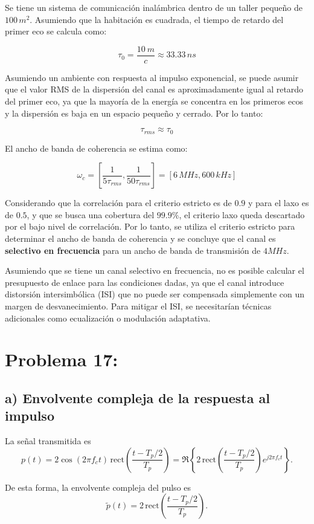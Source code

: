 \documentclass[11pt]{article}
\begin{document}
Se tiene un sistema de comunicación inalámbrica dentro de un taller pequeño de $100 \, m^2$. Asumiendo que la habitación es cuadrada, el tiempo de retardo del primer eco se calcula como:

\[
\tau_0 = \frac{\SI{10}{m}}{c} \approx 33.33 \, ns
\]

Asumiendo un ambiente con respuesta al impulso exponencial, se puede asumir que el valor RMS de la dispersión del canal es aproximadamente igual al retardo del primer eco, ya que la mayoría de la energía se concentra en los primeros ecos y la dispersión es baja en un espacio pequeño y cerrado. Por lo tanto:

\[
\tau_{rms} \approx \tau_0
\]

El ancho de banda de coherencia se estima como:

\[
\omega_c = \left[ \frac{1}{5 \tau_{rms}}, \frac{1}{50 \tau_{rms}} \right] = \left[ 6 \, MHz , 600 \, kHz \right]
\]

Considerando que la correlación para el criterio estricto es de $0.9$ y para el laxo es de $0.5$, y que se busca una cobertura del $99.9\%$, el criterio laxo queda descartado por el bajo nivel de correlación. Por lo tanto, se utiliza el criterio estricto para determinar el ancho de banda de coherencia y se concluye que el canal es \textbf{selectivo en frecuencia} para un ancho de banda de transmisión de $4MHz$.

Asumiendo que se tiene un canal selectivo en frecuencia, no es posible calcular el presupuesto de enlace para las condiciones dadas, ya que el canal introduce distorsión intersimbólica (ISI) que no puede ser compensada simplemente con un margen de desvanecimiento. Para mitigar el ISI, se necesitarían técnicas adicionales como ecualización o modulación adaptativa.

\section*{Problema 17:}

\subsection*{a) Envolvente compleja de la respuesta al impulso}

La señal transmitida es
\[
p(t) = 2 \cos(2\pi f_c t)\, \mathrm{rect}\!\left(\frac{t - T_p/2}{T_p}\right)
      = \Re\left\{ 2\,\mathrm{rect}\!\left(\frac{t - T_p/2}{T_p}\right) e^{j2\pi f_c t} \right\}.
\]

De esta forma, la envolvente compleja del pulso es
\[
\tilde p(t) = 2\,\mathrm{rect}\!\left(\frac{t - T_p/2}{T_p}\right).
\]
\end{document}
